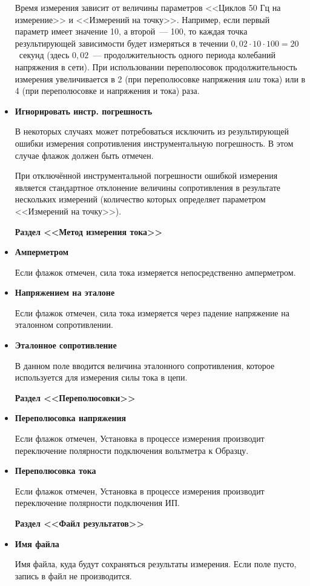 \documentclass[12pt, a4paper, twocolumn]{report}
\newcommand{\PARAM}[1]{\item {\bf #1} }
\newcommand{\PARAMSECTION}[1]{\vbox{}{\bf Раздел <<#1>>}}
\begin{document}
\begin{itemize}
Время измерения зависит от величины параметров <<Циклов 50 Гц на измерение>> и <<Измерений на точку>>. Например, если первый параметр имеет значение 10, а второй~--- 100, то каждая точка результирующей зависимости будет измеряться в течении $0,02 \cdot 10 \cdot 100 = 20$~секунд (здесь $0,02$~--- продолжительность одного периода колебаний напряжения в сети). При использовании переполюсовок продолжительность измерения увеличивается в 2 (при переполюсовке напряжения \emph{или} тока) или в 4 (при переполюсовке и напряжения и тока) раза.

\PARAM{Игнорировать инстр. погрешность}

В некоторых случаях может потребоваться исключить из результирующей ошибки измерения сопротивления инструментальную погрешность. В этом случае флажок должен быть отмечен.

При отключённой инструментальной погрешности ошибкой измерения является стандартное отклонение величины сопротивления в результате нескольких измерений (количество которых определяет параметром <<Измерений на точку>>).

\PARAMSECTION{Метод измерения тока}

\PARAM{Амперметром}

Если флажок отмечен, сила тока измеряется непосредственно амперметром.

\PARAM{Напряжением на эталоне}

Если флажок отмечен, сила тока измеряется через падение напряжение на эталонном сопротивлении.

\PARAM{Эталонное сопротивление}

В данном поле вводится величина эталонного сопротивления, которое используется для измерения силы тока в цепи.

\PARAMSECTION{Переполюсовки}

\PARAM{Переполюсовка напряжения}

Если флажок отмечен, Установка в процессе измерения производит переключение полярности подключения вольтметра к Образцу.

\PARAM{Переполюсовка тока}

Если флажок отмечен, Установка в процессе измерения производит переключение полярности подключения ИП.

\PARAMSECTION{Файл результатов}

\PARAM{Имя файла}

Имя файла, куда будут сохраняться результаты измерения. Если поле пусто, запись в файл не производится.


\end{itemize}
\end{document}
